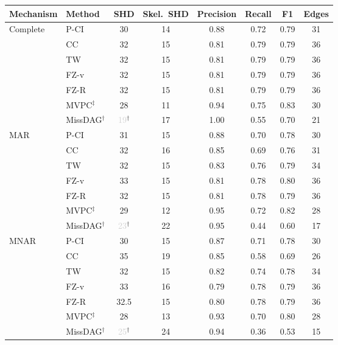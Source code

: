 \begin{tabular}{llcccccc}
    \toprule
    Mechanism & Method & SHD & Skel.\ SHD & Precision & Recall & F1 & Edges \\
    \midrule
    Complete  & P-CI               & 30 & 14 & 0.88 & 0.72 & 0.79 & 31 \\
              & CC                 & 32 & 15 & 0.81 & 0.79 & 0.79 & 36 \\
              & TW                 & 32 & 15 & 0.81 & 0.79 & 0.79 & 36 \\
              & FZ-v               & 32 & 15 & 0.81 & 0.79 & 0.79 & 36 \\
              & FZ-R               & 32 & 15 & 0.81 & 0.79 & 0.79 & 36 \\
              & MVPC$^\ddagger$    & 28 & 11 & 0.94 & 0.75 & 0.83 & 30 \\
              & MissDAG$^\dagger$  & \textcolor{lightgray}{19}$^\dagger$ & 17 & 1.00 & 0.55 & 0.70 & 21 \\
    \midrule
    MAR       & P-CI               & 31 & 15 & 0.88 & 0.70 & 0.78 & 30 \\
              & CC                 & 32 & 16 & 0.85 & 0.69 & 0.76 & 31 \\
              & TW                 & 32 & 15 & 0.83 & 0.76 & 0.79 & 34 \\
              & FZ-v               & 33 & 15 & 0.81 & 0.78 & 0.80 & 36 \\
              & FZ-R               & 32 & 15 & 0.81 & 0.78 & 0.79 & 36 \\
              & MVPC$^\ddagger$    & 29 & 12 & 0.95 & 0.72 & 0.82 & 28 \\
              & MissDAG$^\dagger$  & \textcolor{lightgray}{23}$^\dagger$ & 22 & 0.95 & 0.44 & 0.60 & 17 \\
    \midrule
    MNAR      & P-CI               & 30 & 15 & 0.87 & 0.71 & 0.78 & 30 \\
              & CC                 & 35 & 19 & 0.85 & 0.58 & 0.69 & 26 \\
              & TW                 & 32 & 15 & 0.82 & 0.74 & 0.78 & 34 \\
              & FZ-v               & 33 & 16 & 0.79 & 0.78 & 0.79 & 36 \\
              & FZ-R               & 32.5 & 15 & 0.80 & 0.78 & 0.79 & 36 \\
              & MVPC$^\ddagger$    & 28 & 13 & 0.93 & 0.70 & 0.80 & 28 \\
              & MissDAG$^\dagger$  & \textcolor{lightgray}{25}$^\dagger$ & 24 & 0.94 & 0.36 & 0.53 & 15 \\

\end{tabular}
